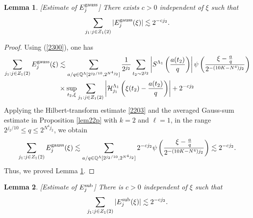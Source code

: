 \documentclass[11 pt,letterpaper]{amsart}
\theoremstyle{plain}
\newtheorem{lemma}{Lemma}\numberwithin{lemma}{section}
\theoremstyle{definition}
\theoremstyle{remark} \theoremstyle{exam} \theoremstyle{ob}
\numberwithin{equation}{section}
\begin{document}
 \begin{lemma}\label{lem850}[Estimate of $E_j^{\rm{gauss}}$]
  There exists $c>0$ independent of $\xi$ such that 
$$\sum_{j_1:j\in Z_1(2)} |E^{\rm{gauss}}_j(\xi)|\lesssim 2^{-cj_2}.$$
\end{lemma}
\begin{proof}
Using (\ref{2300}),  one has
  \begin{align*}
\sum_{j_1:j\in Z_1(2)} E^{\rm{gauss}}_j(\xi)
&\lesssim \sum_{a/q\in  \mathbb{Q}^{\Lambda}[2^{j_2/10},2^{N^4j_2}]} \frac{1}{2^{j_2}}\sum_{t_2\sim 2^{j_2}}\left|S^{\Lambda_1}\left( \frac{a(t_2)}{q} \right)\right|\psi\left(\frac{\xi-\frac{a}{q}}{2^{-(10K-N^4)j_2}}\right) \\
 &\times\sup_{t_2,\xi} \sum_{j_1:j\in Z_1(2)}\left|\mathcal{H}^{\Lambda_1}_{j_1}\left( \xi(t_2)-\frac{a(t_2)}{q}  \right)\right| +2^{-cj_2}
 \end{align*}
Applying the Hilbert-transform estimate \eqref{2203} and 
 the averaged Gauss-sum estimate in Proposition \ref{lem22p} with $k=2$ and $\ell=1$, in the range $  2^{j_2/10}\le q\le 2^{N^4j_2}$, we obtain
$$
 \sum_{j_1:j\in Z_1(2)} E^{\rm{gauss}}_j(\xi)\lesssim \sum_{a/q\in  \mathbb{Q}^{\Lambda}[2^{j_2/10},2^{N^4j_2}]}2^{-cj_2} \psi\left(\frac{\xi-\frac{a}{q}}{2^{-(10K-N^4)j_2}}\right)  \lesssim 2^{-cj_2}.
$$
Thus, we proved Lemma \ref{lem850}.
\end{proof} 



\begin{lemma}\label{lem57}[Estimate of $E_j^{\rm{sub}}$]\label{lem36}  There is $c>0$  independent of $\xi$ such that 
$$\sum_{j_1:j\in Z_1(2)} |E^{\rm{sub}}_j(\xi)| \lesssim 2^{-cj_2}.$$
\end{lemma}
\end{document}
